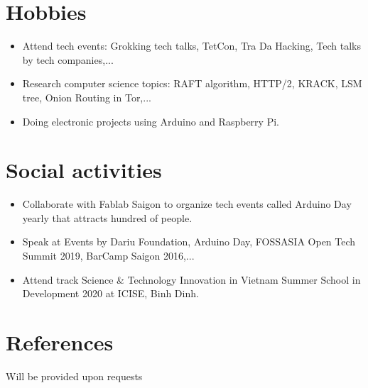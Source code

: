 \documentclass[letterpaper,11pt]{article}
\newcommand{\resumeItemNornal}[1]{
  \item\small{
    {#1 \vspace{-2pt}}
  }
}
\newcommand{\resumeSubItemNormal}[1]{\resumeItemNornal{#1}\vspace{-4pt}}
\newcommand{\resumeSubHeadingListStart}{\begin{itemize}[leftmargin=*]}
\newcommand{\resumeSubHeadingListEnd}{\end{itemize}}
\begin{document}
\section{Hobbies}
  \resumeSubHeadingListStart
    \resumeSubItemNormal
      {Attend tech events: Grokking tech talks, TetCon, Tra Da Hacking, Tech talks by tech companies,...}
    \resumeSubItemNormal
      {Research computer science topics: RAFT algorithm, HTTP/2, KRACK, LSM tree, Onion Routing in Tor,...}
  \resumeSubItemNormal
      {Doing electronic projects using Arduino and Raspberry Pi.}
\resumeSubHeadingListEnd

\section{Social activities}
  \resumeSubHeadingListStart
    \resumeSubItemNormal
      {Collaborate with Fablab Saigon to organize tech events called Arduino Day yearly that attracts hundred of people.}
    \resumeSubItemNormal
      {Speak at Events by Dariu Foundation, Arduino Day, FOSSASIA Open Tech Summit 2019, BarCamp Saigon 2016,...}
    \resumeSubItemNormal
      {Attend track Science \& Technology Innovation in Vietnam Summer School in Development 2020 at ICISE, Binh Dinh.}
\resumeSubHeadingListEnd


\section{References}
  \small{Will be provided upon requests}

\end{document}
